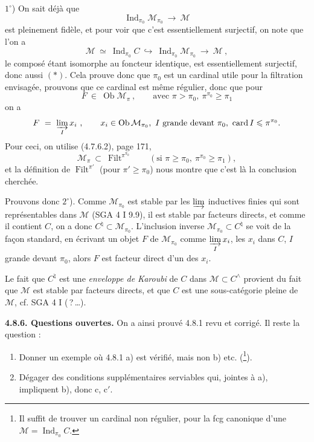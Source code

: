 \documentclass[11pt]{article}
\newcommand{\msp}[1]{\marginpar{\footnotesize [#1]}}
\newcommand{\Ob}{\operatorname{Ob}}
\newcommand{\Ind}{\operatorname{Ind}}
\newcommand{\Filt}{\operatorname{Filt}}
\newcommand{\card}{\operatorname{card}}
\begin{document}
$1^\circ$) On sait déjà que
\[
\Ind_{\pi_0}\mathcal{M}_{\pi_0} \ \longrightarrow \ \mathcal{M} \tag*{$(*)$}
\]
est pleinement fidèle, et pour voir que c'est essentiellement surjectif, on note que l'on a
\[
\mathcal{M} \ \simeq \ \Ind_{\pi_0}C \ \hookrightarrow \ \Ind_{\pi_0}\mathcal{M}_{\pi_0} \ \longrightarrow \ \mathcal{M} \ ,
\]
le composé étant isomorphe au foncteur identique, est essentiellement surjectif, donc aussi $(*)$. Cela prouve donc que $\pi_0$ est un cardinal utile pour la filtration envisagée, prouvons que ce cardinal est même régulier, donc que pour
\[
F \ \in \ \Ob\mathcal{M}_\pi \ , \qquad \text{avec } \pi>\pi_0,\ \pi^{\pi_0}\geqslant\pi_1
\]
on a
\[
F \ = \ \varinjlim_I x_i \ , \qquad x_i\in\Ob\mathcal{M}_{\pi_0},\ I \text{ grande devant } \pi_0,\ \card I\leqslant\pi^{\pi_0}.
\]
\msp{page 202}
Pour ceci, on utilise (4.7.6.2), page 171,
\[
\mathcal{M}_\pi \ \subset \ \Filt^{\pi^{\pi_0}} \qquad (\text{si } \pi\geqslant\pi_0,\ \pi^{\pi_0}\geqslant\pi_1),
\]
et la définition de $\Filt^{\pi'}$ (pour $\pi'\geqslant\pi_0$) nous montre que c'est là la conclusion cherchée.

Prouvons donc $2^\circ$). Comme $\mathcal{M}_{\pi_0}$ est stable par les $\varinjlim$ inductives finies qui sont représentables dans $\mathcal{M}$ (SGA 4 I 9.9), il est stable par facteurs directs, et comme il contient $C$, on a donc $C^\natural\subset\mathcal{M}_{\pi_0}$. L'inclusion inverse $\mathcal{M}_{\pi_0}\subset C^\natural$ se voit de la façon standard, en écrivant un objet $F$ de $\mathcal{M}_{\pi_0}$ comme $\varinjlim\limits_I x_i$, les $x_i$ dans $C$, $I$ grande devant $\pi_0$, alors $F$ est facteur direct d'un des $x_i$.

Le fait que $C^\natural$ est une \textit{enveloppe de Karoubi} de $C$ dans $\mathcal{M}\subset C^\wedge$ provient du fait que $\mathcal{M}$ est stable par facteurs directs, et que $C$ est une sous-catégorie pleine de $\mathcal{M}$, cf. SGA 4 I (\,?\,\dots).

\textbf{4.8.6. Questions ouvertes.} On a ainsi prouvé 4.8.1 revu et corrigé. Il reste la question :
\begin{enumerate}
\item[1)] Donner un exemple où 4.8.1 a) est vérifié, mais non b) etc. (\footnote{Il suffit de trouver un cardinal non régulier, pour la fcg canonique d'une $\mathcal{M}=\Ind_{\pi_0}C$.}).
\item[2)] Dégager des conditions supplémentaires serviables qui, jointes à a), impliquent b), donc c, c$'$.
\end{enumerate}
\end{document}
